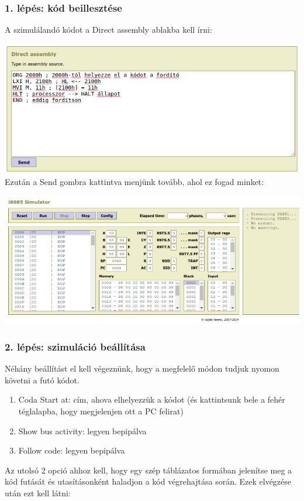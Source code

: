 \documentclass{article}
\begin{document}
\subsubsection{1. lépés: kód beillesztése}
A szimulálandó kódot a Direct assembly ablakba kell írni:

\includegraphics[scale=0.5]{sim_lepes1.png} \\
Ezután a Send gombra kattintva menjünk tovább, ahol ez fogad minket:

\includegraphics[scale=0.5]{sim_lepes2.png}

\subsubsection{2. lépés: szimuláció beállítása}

Néhány beállítást el kell végeznünk, hogy a megfelelő módon tudjuk nyomon követni a futó kódot.
\begin{enumerate}
	\item Coda Start at: cím, ahova elhelyezzük a kódot (és kattintsunk bele a fehér téglalapba, hogy megjelenjen ott a PC felirat)
	\item Show bus activity: legyen bepipálva
	\item Follow code: legyen bepipálva
\end{enumerate}
Az utolsó 2 opció ahhoz kell, hogy egy szép táblázatos formában jelenítse meg a kód futását és utasításonként haladjon a kód végrehajtása során.
Ezek elvégzése után ezt kell látni:
\end{document}
